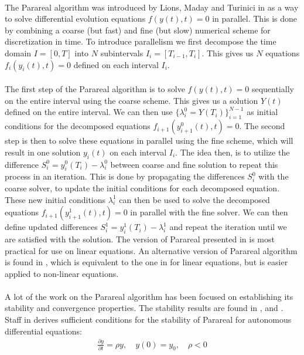 \noindent
\\
The Parareal algorithm was introduced by Lions, Maday and Turinici in \cite{lions2001resolution} as a way to solve differential evolution equations $f(y(t),t)=0$ in parallel. This is done by combining a coarse (but fast) and fine (but slow) numerical scheme for discretization in time. To introduce parallelism we first decompose the time domain $I=[0,T]$ into $N$ subintervals $I_i=[T_{i-1},T_i]$. This gives us $N$ equations $f_i(y_i(t),t)=0$ defined on each interval $I_i$. 
\\
\\
The first step of the Parareal algorithm is to solve $f(y(t),t)=0$ sequentially on the entire interval using the coarse scheme. This gives us a solution $Y(t)$ defined on the entire interval. We can then use $\{\lambda_i^0=Y(T_i)\}_{i=1}^{N-1}$ as initial conditions for the decomposed equations $f_{i+1}(y_{i+1}^0(t),t)=0$. The second step is then to solve these equations in parallel using the fine scheme, which will result in one solution $y_i(t)$ on each interval $I_i$. The idea then, is to utilize the difference $S_i^0=y_i^0(T_{i})-\lambda_i^0$ between coarse and fine solution to repeat this process in an iteration. This is done by propagating the differences $S_i^0$ with the coarse solver, to update the initial conditions for each decomposed equation. These new initial conditions $\lambda_i^1$ can then be used to solve the decomposed equations $f_{i+1}(y_{i+1}^1(t),t)=0$ in parallel with the fine solver. We can then define updated differences $S_i^1=y_i^1(T_{i})-\lambda_i^1$ and repeat the iteration until we are satisfied with the solution. The version of Parareal presented in \cite{lions2001resolution} is most practical for use on linear equations. An alternative version of Parareal algorithm is found in \cite{baffico2002parallel}, which is equivalent to the one in \cite{lions2001resolution} for linear equations, but is easier applied to non-linear equations.
\\
\\
A lot of the work on the Parareal algorithm has been focused on establishing its stability and convergence properties. The stability results are found in \cite{staff2005stability},\cite{maday2007parareal} and \cite{bal2005convergence}. Staff in \cite{staff2005stability} derives sufficient conditions for the stability of Parareal for autonomous differential equations:
\begin{align}
\frac{\partial y}{\partial t} =\rho y,\quad y(0)=y_0,\quad  \rho<0 \label{autonom E}
\end{align}
